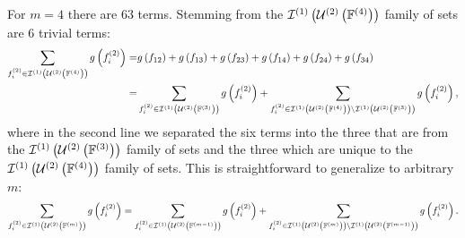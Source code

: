 \documentclass[11pt]{article}
\newcommand{\gxn}[1]{g\left(#1\right)}
\newcommand{\fn}[1]{f^{(#1)}}
\newcommand{\ints}[2]{\mathcal{I}^{(#1)}\left(#2\right)}
\newcommand{\fmem}[2]{f^{\left(#1\right)}_{#2}}
\begin{document}
\newcommand{\intsset}[3]{\ints{#1}{\unionset{#2}{#3}}}

For $m=4$ there are 63 terms. Stemming from the $\intsset{1}{2}{4}$ family of
sets are 6 trivial terms:
\begin{align}
	\sum_{\fmem{2}{i}\in\intsset{1}{2}{4}}\gxn{\fmem{2}{i}} =&
	  \gxn{\Di} + \gxn{\Dj} + \gxn{\Dk} + \gxn{\Dl} +
	  \gxn{\Dm} + \gxn{\Dn}\nonumber\\
	=& \sum_{\fmem{2}{i}\in\intsset{1}{2}{3}}\gxn{\fmem{2}{i}} +
	   \sum_{\fmem{2}{i}\in\intsset{1}{2}{4}\setminus\intsset{1}{2}{3}}
	    \gxn{\fn{2}_i},
\end{align}
where in the second line we separated the six terms into the three that are
from the $\intsset{1}{2}{3}$ family of sets and the three which are unique to
the $\intsset{1}{2}{4}$ family of sets. This is straightforward to generalize
to arbitrary $m$:
\begin{align}
    \sum_{\fmem{2}{i}\in\intsset{1}{2}{m}}\gxn{\fmem{2}{i}} =
    \sum_{\fmem{2}{i}\in\intsset{1}{2}{m-1}}\gxn{\fmem{2}{i}} +
    \sum_{\fmem{2}{i}\in\intsset{1}{2}{m}\setminus\intsset{1}{2}{m-1}}
    \gxn{\fn{2}_i}.
\end{align}
\end{document}
